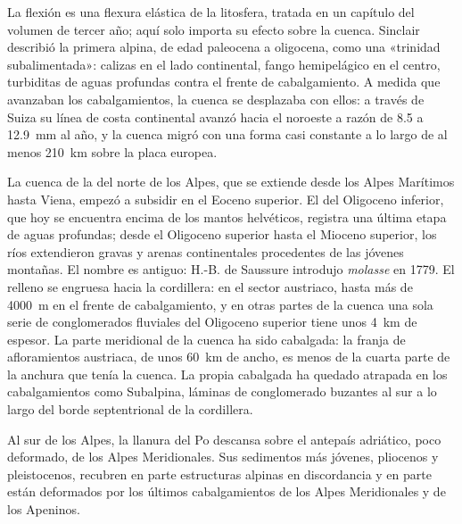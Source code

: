 La flexión es una flexura elástica de la litosfera, tratada en un capítulo del volumen de tercer
año; aquí solo importa su efecto sobre la cuenca. Sinclair describió la primera  alpina, de edad paleocena a oligocena,
como una «trinidad subalimentada»: calizas en el lado continental, fango hemipelágico en el
centro, turbiditas de aguas profundas contra el frente de cabalgamiento. A medida que avanzaban los cabalgamientos, la cuenca
se desplazaba con ellos: a través de Suiza su línea de costa continental avanzó hacia el noroeste a razón de 8.5
a \qty{12.9}{mm} al año, y la cuenca migró con una forma casi constante a lo largo de al menos
\qty{210}{km} sobre la placa europea.

La cuenca de la  del norte de los Alpes, que se extiende desde los Alpes Marítimos hasta Viena, empezó a
subsidir en el Eoceno superior. El  del Oligoceno inferior, que hoy se encuentra encima de los mantos
helvéticos, registra una última etapa de aguas profundas; desde el Oligoceno superior hasta el Mioceno superior, los ríos
extendieron gravas y arenas continentales procedentes de las jóvenes montañas. El nombre es antiguo: H.-B. de Saussure
introdujo \emph{molasse} en 1779. El relleno se engruesa hacia la cordillera: en el
sector austriaco, hasta más de \qty{4000}{m} en el frente de cabalgamiento, y en otras partes de la cuenca
una sola serie de conglomerados fluviales del Oligoceno superior tiene unos \qty{4}{km} de espesor. La parte meridional de
la cuenca ha sido cabalgada: la franja de afloramientos austriaca, de unos \qty{60}{km} de ancho, es menos
de la cuarta parte de la anchura que tenía la cuenca. La propia  cabalgada ha quedado atrapada en
los cabalgamientos como  Subalpina, láminas de conglomerado buzantes al sur a lo largo del
borde septentrional de la cordillera.

Al sur de los Alpes, la llanura del Po descansa sobre el antepaís adriático, poco deformado, de los
Alpes Meridionales. Sus sedimentos más jóvenes, pliocenos y pleistocenos, recubren en parte estructuras alpinas
en discordancia y en parte están deformados por los últimos cabalgamientos de los Alpes Meridionales
y de los Apeninos.

